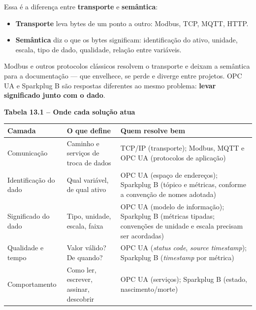 Essa é a diferença entre \textbf{transporte} e \textbf{semântica}:

\begin{itemize}
\tightlist
\item
  \textbf{Transporte} leva bytes de um ponto a outro: Modbus, TCP, MQTT, HTTP.
\item
  \textbf{Semântica} diz o que os bytes significam: identificação do ativo, unidade, escala, tipo de dado, qualidade, relação entre variáveis.
\end{itemize}

Modbus e outros protocolos clássicos resolvem o transporte e deixam a semântica para a documentação --- que envelhece, se perde e diverge entre projetos. OPC UA e Sparkplug B são respostas diferentes ao mesmo problema: \textbf{levar significado junto com o dado}.

\textbf{Tabela 13.1 -- Onde cada solução atua}

\begin{longtable}[]{@{}
  >{\raggedright\arraybackslash}p{}
  >{\raggedright\arraybackslash}p{}
  >{\raggedright\arraybackslash}p{}@{}}
\toprule\noalign{}
\begin{minipage}[b]{\linewidth}\raggedright
Camada
\end{minipage} & \begin{minipage}[b]{\linewidth}\raggedright
O que define
\end{minipage} & \begin{minipage}[b]{\linewidth}\raggedright
Quem resolve bem
\end{minipage} \\
\midrule\noalign{}
\endhead
\bottomrule\noalign{}
\endlastfoot
Comunicação & Caminho e serviços de troca de dados & TCP/IP (transporte); Modbus, MQTT e OPC UA (protocolos de aplicação) \\
Identificação do dado & Qual variável, de qual ativo & OPC UA (espaço de endereços); Sparkplug B (tópico e métricas, conforme a convenção de nomes adotada) \\
Significado do dado & Tipo, unidade, escala, faixa & OPC UA (modelo de informação); Sparkplug B (métricas tipadas; convenções de unidade e escala precisam ser acordadas) \\
Qualidade e tempo & Valor válido? De quando? & OPC UA (\emph{status code}, \emph{source timestamp}); Sparkplug B (\emph{timestamp} por métrica) \\
Comportamento & Como ler, escrever, assinar, descobrir & OPC UA (serviços); Sparkplug B (estado, nascimento/morte) \\
\end{longtable}

